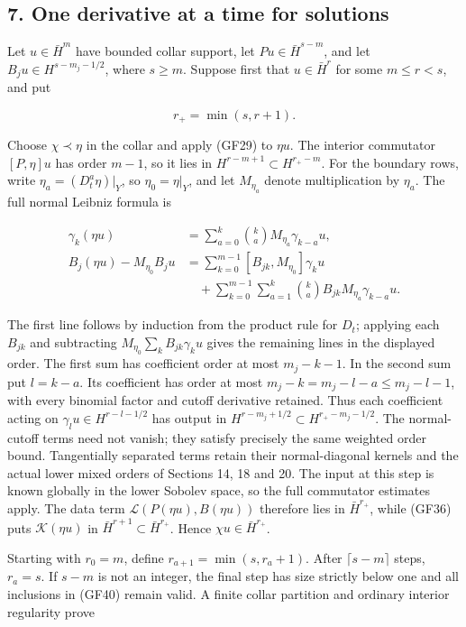 \documentclass[
  11pt,
]{article}
\begin{document}
\subsection{7. One derivative at a time for
solutions}\label{one-derivative-at-a-time-for-solutions}

Let \(u\in\bar H^m\) have bounded collar support, let
\(Pu\in\bar H^{s-m}\), and let \(B_ju\in H^{s-m_j-1/2}\), where
\(s\geq m\). Suppose first that \(u\in\bar H^r\) for some \(m\leq r<s\),
and put

\[
 r_+=\min(s,r+1).
 \tag{GF39}
\]

Choose \(\chi\prec\eta\) in the collar and apply (GF29) to \(\eta u\).
The interior commutator \([P,\eta]u\) has order \(m-1\), so it lies in
\(H^{r-m+1}\subset H^{r_+-m}\). For the boundary rows, write
\(\eta_a=(D_t^a\eta)|_Y\), so \(\eta_0=\eta|_Y\), and let \(M_{\eta_a}\)
denote multiplication by \(\eta_a\). The full normal Leibniz formula is

\[
 \begin{aligned}
 \gamma_k(\eta u)
 &=\sum_{a=0}^k\binom ka M_{\eta_a}\gamma_{k-a}u,\\
 B_j(\eta u)-M_{\eta_0}B_ju
 &=\sum_{k=0}^{m-1}[B_{jk},M_{\eta_0}]\gamma_ku\\
 &\quad+\sum_{k=0}^{m-1}\sum_{a=1}^k
     \binom ka B_{jk}M_{\eta_a}\gamma_{k-a}u.
 \end{aligned}
 \tag{GF40}
\]

The first line follows by induction from the product rule for \(D_t\);
applying each \(B_{jk}\) and subtracting
\(M_{\eta_0}\sum_kB_{jk}\gamma_ku\) gives the remaining lines in the
displayed order. The first sum has coefficient order at most
\(m_j-k-1\). In the second sum put \(l=k-a\). Its coefficient has order
at most \(m_j-k=m_j-l-a\leq m_j-l-1\), with every binomial factor and
cutoff derivative retained. Thus each coefficient acting on
\(\gamma_lu\in H^{r-l-1/2}\) has output in
\(H^{r-m_j+1/2}\subset H^{r_+-m_j-1/2}\). The normal-cutoff terms need
not vanish; they satisfy precisely the same weighted order bound.
Tangentially separated terms retain their normal-diagonal kernels and
the actual lower mixed orders of Sections 14, 18 and 20. The input at
this step is known globally in the lower Sobolev space, so the full
commutator estimates apply. The data term
\(\mathscr L(P(\eta u),B(\eta u))\) therefore lies in \(\bar H^{r_+}\),
while (GF36) puts \(\mathscr K(\eta u)\) in
\(\bar H^{r+1}\subset\bar H^{r_+}\). Hence \(\chi u\in\bar H^{r_+}\).

Starting with \(r_0=m\), define \(r_{a+1}=\min(s,r_a+1)\). After
\(\lceil s-m\rceil\) steps, \(r_a=s\). If \(s-m\) is not an integer, the
final step has size strictly below one and all inclusions in (GF40)
remain valid. A finite collar partition and ordinary interior regularity
prove
\end{document}
